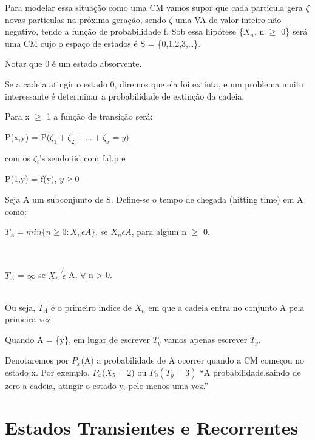 \documentclass[]{article}
\providecommand{\tightlist}{%
  \setlength{\itemsep}{0pt}\setlength{\parskip}{0pt}}
\theoremstyle{definition}
\theoremstyle{definition}
\theoremstyle{definition}
\theoremstyle{remark}
\let\BeginKnitrBlock\begin \let\EndKnitrBlock\end
\begin{document}
Para modelar essa situação como uma CM vamos supor que cada particula
gera \(\zeta\) novas particulas na próxima geração, sendo \(\zeta\) uma
VA de valor inteiro não negativo, tendo a função de probabilidade f. Sob
essa hipótese \{\(X_n\), n \(\geq\) 0\} será uma CM cujo o espaço de
estados é S = \{0,1,2,3,\ldots{}\}.

Notar que 0 é um estado absorvente.

Se a cadeia atingir o estado 0, diremos que ela foi extinta, e um
problema muito interessante é determinar a probabilidade de extinção da
cadeia.

Para x \(\geq\) 1 a função de transição será:

P(x,y) = P(\(\zeta_1 + \zeta_2 + ... + \zeta_x = y)\)

com os \(\zeta_i\)'s sendo iid com f.d.p e

P(1,y) = f(y), \(y \geq 0\)

\BeginKnitrBlock{definition}
\protect\hypertarget{def:unnamed-chunk-33}{}{\label{def:unnamed-chunk-33}
}Seja A um subconjunto de S. Define-se o tempo de chegada (hitting time)
em A como:

\(T_A = min\{n \geq 0: X_n \epsilon A\}\), se \(X_n \epsilon A\), para
algum n \(\geq\) 0.
\EndKnitrBlock{definition}\\
\BeginKnitrBlock{definition}
\protect\hypertarget{def:unnamed-chunk-34}{}{\label{def:unnamed-chunk-34}
}\(T_A\) = \(\infty\) se \(X_n\) \(\not{\epsilon}\) A, \(\forall\) n
\textgreater{} 0.
\EndKnitrBlock{definition}\\
Ou seja, \(T_A\) é o primeiro indice de \(X_n\) em que a cadeia entra no
conjunto A pela primeira vez.

\begin{description}
\tightlist
\item[NOTAÇÃO]
Quando A = \{y\}, em lugar de escrever \(T_{{y}}\) vamos apenas escrever
\(T_y\).
\item[NOTAÇÃO]
Denotaremos por \(P_x\)(A) a probabilidade de A ocorrer quando a CM
começou no estado x. Por exemplo, \(P_x\)(\(X_5 = 2\)) ou \(P_0(T_y=3)\)
``A probabilidade,saindo de zero a cadeia, atingir o estado y, pelo
menos uma vez.''
\end{description}

\section{Estados Transientes e
Recorrentes}\label{estados-transientes-e-recorrentes}
\end{document}
